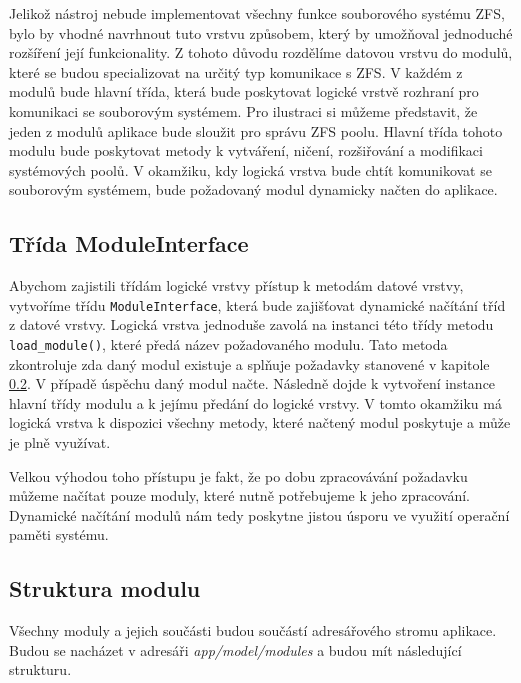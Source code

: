 Jelikož nástroj nebude implementovat všechny funkce souborového systému ZFS, bylo by vhodné navrhnout tuto vrstvu způsobem, který by umožňoval jednoduché rozšíření její funkcionality.
Z tohoto důvodu rozdělíme datovou vrstvu do modulů, které se budou specializovat na určitý typ komunikace s ZFS. V každém z modulů bude hlavní třída, která bude poskytovat logické vrstvě rozhraní pro komunikaci se souborovým systémem. Pro ilustraci si můžeme představit, že jeden z modulů aplikace bude sloužit pro správu ZFS poolu. Hlavní třída tohoto modulu bude poskytovat metody k vytváření, ničení, rozšiřování a modifikaci systémových poolů. V okamžiku, kdy logická vrstva bude chtít komunikovat se souborovým systémem, bude požadovaný modul dynamicky načten do aplikace.
    \subsection{Třída ModuleInterface}
    Abychom zajistili třídám logické vrstvy přístup k metodám datové vrstvy, vytvoříme třídu \verb|ModuleInterface|, která bude zajišťovat dynamické načítání tříd z datové vrstvy. Logická vrstva jednoduše zavolá na instanci této třídy metodu \verb|load_module()|, které předá název požadovaného modulu. Tato metoda zkontroluje zda daný modul existuje a splňuje požadavky stanovené v kapitole \ref{package}. V případě úspěchu daný modul načte. Následně dojde k vytvoření instance hlavní třídy modulu a k jejímu předání do logické vrstvy. V tomto okamžiku má logická vrstva k dispozici všechny metody, které načtený modul poskytuje a může je plně využívat.

    Velkou výhodou toho přístupu je fakt, že po dobu zpracovávání požadavku můžeme načítat pouze moduly, které nutně potřebujeme k jeho zpracování. Dynamické načítání modulů nám tedy poskytne jistou úsporu ve využití operační paměti systému.
    \subsection{Struktura modulu}
    \label{package}
    Všechny moduly a jejich součásti budou součástí adresářového stromu aplikace. Budou se nacházet v adresáři \emph{app/model/modules} a budou mít následující strukturu.
    \begin{figure}
      \centering
    \end{figure}

